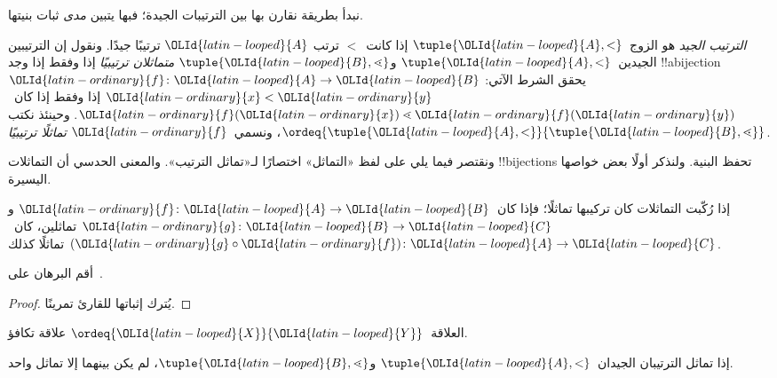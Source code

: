 \documentclass[../../../include/open-logic-section]{subfiles}
\begin{document}

نبدأ بطريقة نقارن بها بين الترتيبات الجيدة؛ فبها يتبين \emph{مدى}
ثبات بنيتها.

\begin{defn}
\emph{الترتيب الجيد} هو الزوج~$\tuple{{\OLId{latin-looped}{A}}, <}$ إذا كانت~$<$ ترتب
${\OLId{latin-looped}{A}}$ ترتيبًا جيدًا. ونقول إن الترتيبين الجيدين~$\tuple{{\OLId{latin-looped}{A}}, <}$
و$\tuple{{\OLId{latin-looped}{B}}, \lessdot}$ \emph{متماثلان ترتيبيًا} إذا وفقط إذا وجد
!!a{bijection}~${\OLId{latin-ordinary}{f}} \colon {\OLId{latin-looped}{A}} \to {\OLId{latin-looped}{B}}$ يحقق الشرط الآتي: ${\OLId{latin-ordinary}{x}} < {\OLId{latin-ordinary}{y}}$ إذا
وفقط إذا كان~${\OLId{latin-ordinary}{f}}({\OLId{latin-ordinary}{x}}) \lessdot {\OLId{latin-ordinary}{f}}({\OLId{latin-ordinary}{y}})$. وحينئذ نكتب
$\ordeq{\tuple{{\OLId{latin-looped}{A}}, <}}{\tuple{{\OLId{latin-looped}{B}}, \lessdot}}$، ونسمي~${\OLId{latin-ordinary}{f}}$
\emph{تماثلًا ترتيبيًا}.
\end{defn}
\noindent
ونقتصر فيما يلي على لفظ «التماثل» اختصارًا لـ«تماثل الترتيب». والمعنى
الحدسي أن التماثلات !!{bijection}s تحفظ البنية. ولنذكر أولًا بعض
خواصها اليسيرة.

\begin{lem}
إذا رُكّبت التماثلات كان تركيبها تماثلًا؛ فإذا كان~${\OLId{latin-ordinary}{f}} \colon {\OLId{latin-looped}{A}} \to {\OLId{latin-looped}{B}}$
و${\OLId{latin-ordinary}{g}} \colon {\OLId{latin-looped}{B}} \to {\OLId{latin-looped}{C}}$ تماثلين، كان~$({\OLId{latin-ordinary}{g}} \circ {\OLId{latin-ordinary}{f}}) \colon {\OLId{latin-looped}{A}} \to {\OLId{latin-looped}{C}}$
تماثلًا كذلك.
\end{lem}
\begin{prob}
أقم البرهان على~.
\end{prob}
\begin{proof}
يُترك إثباتها للقارئ تمرينًا.
\end{proof}
\begin{cor}
العلاقة~$\ordeq{{\OLId{latin-looped}{X}}}{{\OLId{latin-looped}{Y}}}$ علاقة تكافؤ.
\end{cor}
\begin{prop}
إذا تماثل الترتيبان الجيدان~$\tuple{{\OLId{latin-looped}{A}}, <}$ و$\tuple{{\OLId{latin-looped}{B}}, \lessdot}$،
لم يكن بينهما إلا تماثل واحد.
\end{prop}
\end{document}

